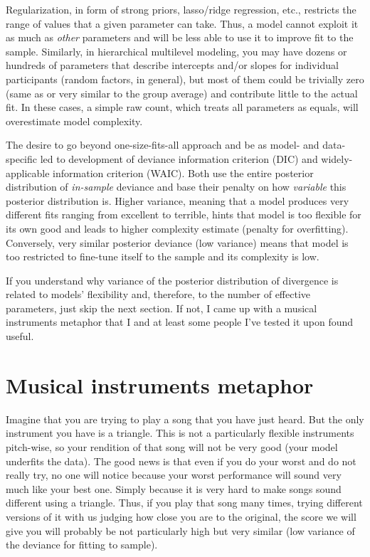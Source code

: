\documentclass[
]{book}
\begin{document}
Regularization, in form of strong priors, lasso/ridge regression, etc., restricts the range of values that a given parameter can take. Thus, a model cannot exploit it as much as \emph{other} parameters and will be less able to use it to improve fit to the sample. Similarly, in hierarchical multilevel modeling, you may have dozens or hundreds of parameters that describe intercepts and/or slopes for individual participants (random factors, in general), but most of them could be trivially zero (same as or very similar to the group average) and contribute little to the actual fit. In these cases, a simple raw count, which treats all parameters as equals, will overestimate model complexity.

The desire to go beyond one-size-fits-all approach and be as model- and data-specific led to development of deviance information criterion (DIC) and widely-applicable information criterion (WAIC). Both use the entire posterior distribution of \emph{in-sample} deviance and base their penalty on how \emph{variable} this posterior distribution is. Higher variance, meaning that a model produces very different fits ranging from excellent to terrible, hints that model is too flexible for its own good and leads to higher complexity estimate (penalty for overfitting). Conversely, very similar posterior deviance (low variance) means that model is too restricted to fine-tune itself to the sample and its complexity is low.

If you understand why variance of the posterior distribution of divergence is related to models' flexibility and, therefore, to the number of effective parameters, just skip the next section. If not, I came up with a musical instruments metaphor that I and at least some people I've tested it upon found useful.

\hypertarget{musical-instruments-metaphor}{%
\section{Musical instruments metaphor}\label{musical-instruments-metaphor}}

Imagine that you are trying to play a song that you have just heard. But the only instrument you have is a triangle. This is not a particularly flexible instruments pitch-wise, so your rendition of that song will not be very good (your model underfits the data). The good news is that even if you do your worst and do not really try, no one will notice because your worst performance will sound very much like your best one. Simply because it is very hard to make songs sound different using a triangle. Thus, if you play that song many times, trying different versions of it with us judging how close you are to the original, the score we will give you will probably be not particularly high but very similar (low variance of the deviance for fitting to sample).
\end{document}
